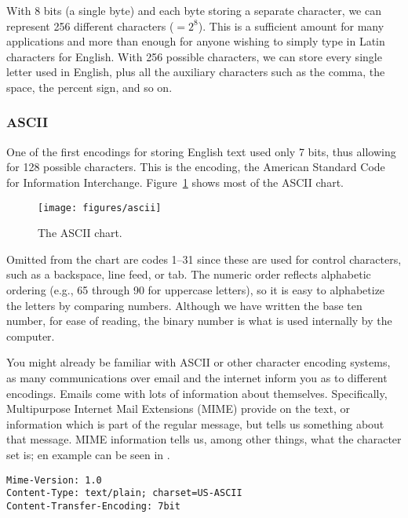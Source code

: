 With 8 bits (a single byte) and each byte storing a separate
character, we can represent 256 different characters ($= 2^{8}$).
This is a sufficient amount for many applications and more than enough
for anyone wishing to simply type in Latin characters for English.
With 256 possible characters, we can store every single letter used in
English, plus all the auxiliary characters such as the comma, the
space, the percent sign, and so on.

\subsubsection{ASCII}

One of the first encodings for storing English text used only 7 bits,
thus allowing for 128 possible characters.  This is the
 encoding, the American Standard Code for Information
Interchange.  Figure~\ref{fig:ascii} shows most of the ASCII chart.

\begin{figure}
\texttt{[image: figures/ascii]}
\caption{The ASCII chart.}
\label{fig:ascii}
\end{figure}

Omitted from the chart are codes 1--31 since
these are used for control characters, such as a backspace, line feed,
or tab.  The numeric order reflects alphabetic
ordering (e.g., 65 through 90 for uppercase letters), so it is easy to alphabetize the letters by comparing numbers.  Although we have
written the base ten number, for ease of reading, the binary number is
what is used internally by the computer.

  

You might already be familiar with ASCII or other character encoding
systems, as many communications over email and the internet inform you
as to different encodings.  
Emails come with lots of information about themselves.  Specifically,
Multipurpose Internet Mail Extensions (MIME) provide
 on the text, or information which is part
of the regular message, but tells us something about that message.
MIME information tells us, among other things, what the character set
is; en example can be seen in .  


\ea \label{mime}  \texttt{Mime-Version: 1.0} \\
   \texttt{Content-Type: text/plain; charset=US-ASCII} \\
   \texttt{Content-Transfer-Encoding: 7bit}
\z 

